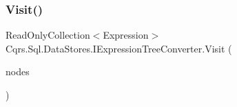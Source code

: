 \subsubsection{\texorpdfstring{Visit()}{Visit()}\hspace{0.1cm}{\footnotesize\ttfamily [2/2]}}
{\footnotesize\ttfamily Read\+Only\+Collection$<$Expression$>$ Cqrs.\+Sql.\+Data\+Stores.\+I\+Expression\+Tree\+Converter.\+Visit (\begin{DoxyParamCaption}\item[{Read\+Only\+Collection$<$ Expression $>$}]{nodes }\end{DoxyParamCaption})}

